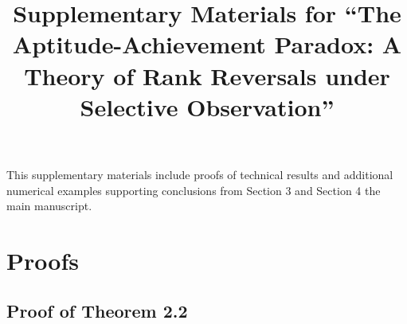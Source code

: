 \documentclass[12pt]{article}
\title{Supplementary Materials for ``The Aptitude-Achievement Paradox: A Theory of Rank Reversals under Selective Observation''}
\date{}
\begin{document}
\maketitle

This supplementary materials include proofs of technical results and additional numerical examples supporting conclusions from  Section 3 and Section 4 the main manuscript. 

\tableofcontents


\section{Proofs}


\subsection{Proof of Theorem 2.2}
\end{document}
